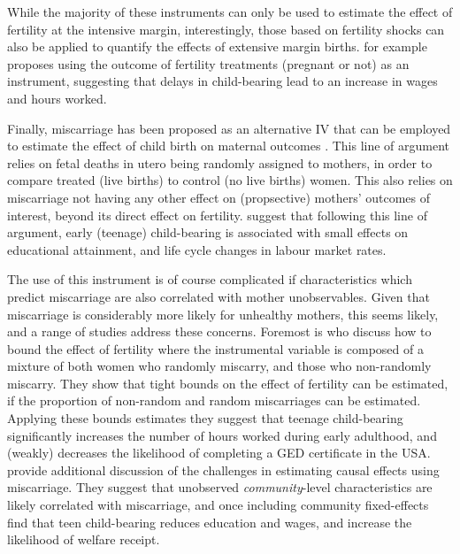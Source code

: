 \documentclass{article}
\begin{document}
\begin{spacing}{1.4}
While the majority of these instruments can only be used to estimate the effect
of fertility at the intensive margin, interestingly, those based on fertility
shocks can also be applied to quantify the effects of extensive margin births. 
\citet{Cristia2008} for example proposes using the outcome of fertility 
treatments (pregnant or not) as an instrument, suggesting that delays in 
child-bearing lead to an increase in wages and hours worked.

Finally, miscarriage has been proposed as an alternative IV that can be employed 
to estimate the effect of child birth on maternal outcomes \citep{Hotzetal2005,
Fletcher2012}. This line of argument relies on fetal deaths in utero being 
randomly assigned to mothers, in order to compare treated (live births) to 
control (no live births) women. This also relies on miscarriage not having any 
other effect on (propsective) mothers' outcomes of interest, beyond its direct 
effect on fertility. \citet{Hotzetal2005} suggest that following this line of 
argument, early (teenage) child-bearing is associated with small effects on 
educational attainment, and life cycle changes in labour market rates.

The use of this instrument is of course complicated if characteristics which
predict miscarriage are also correlated with mother unobservables. Given that
miscarriage is considerably more likely for unhealthy mothers, this seems likely,
and a range of studies address these concerns.  Foremost is \citet{Hotzetal1997} 
who discuss how to bound the effect of fertility where the instrumental variable
is composed of a mixture of both women who randomly miscarry, and those who 
non-randomly miscarry.  They show that tight bounds on the effect of fertility can 
be estimated, if the proportion of non-random and random miscarriages can be
estimated.  Applying these bounds estimates they suggest that teenage child-bearing
significantly increases the number of hours worked during early adulthood, and
(weakly) decreases the likelihood of completing a GED certificate in the USA.
\citet{FletcherWolfe2009} provide additional discussion of the challenges in
estimating causal effects using miscarriage.  They suggest that unobserved
\emph{community}-level characteristics are likely correlated with miscarriage, 
and once including community fixed-effects find that teen child-bearing reduces
education and wages, and increase the likelihood of welfare receipt.



\end{spacing}
\end{document}
